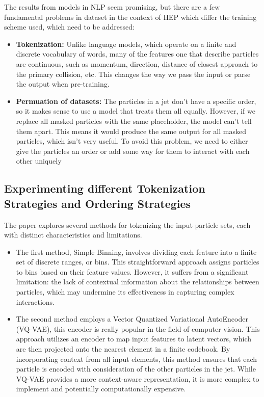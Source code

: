 \documentclass[letterpaper,12pt]{article}
\begin{document}
\begin{spacing}{1.125}
The results from models in NLP seem promising, but there are a few fundamental
problems in dataset in the context of HEP which differ the training scheme used,
which need to be addressed:
\begin{itemize}
  \item \textbf{Tokenization:} Unlike language models, which operate on a finite and
discrete vocabulary of words, many of the features one that describe particles
are continuous, such as momentum, direction, distance of closest approach to
the primary collision, etc. This changes the way we pass the input or parse
the output when pre-training.

\item \textbf{Permuation of datasets:} The particles in a jet don’t have a specific order,
so it makes sense to use a model that treats them all equally. However, if we
replace all masked particles with the same placeholder, the model can’t tell
them apart. This means it would produce the same output for all masked
particles, which isn’t very useful. To avoid this problem, we need to either
give the particles an order or add some way for them to interact with each
other uniquely
\end{itemize}


\subsection{Experimenting different Tokenization Strategies and Ordering Strategies}

The paper explores several methods for tokenizing the input particle sets, each with distinct characteristics and limitations.

\begin{itemize}
\item The first method, Simple Binning, involves dividing each feature into a finite set of discrete ranges, or bins. This straightforward approach assigns particles to bins based on their feature values. However, it suffers from a significant limitation: the lack of contextual information about the relationships between particles, which may undermine its effectiveness in capturing complex interactions.

\item The second method employs a Vector Quantized Variational AutoEncoder
  (VQ-VAE), this encoder is really popular in the field of computer vision. This approach utilizes an encoder to map input features to latent vectors, which are then projected onto the nearest element in a finite codebook. By incorporating context from all input elements, this method ensures that each particle is encoded with consideration of the other particles in the jet. While VQ-VAE provides a more context-aware representation, it is more complex to implement and potentially computationally expensive.


\end{itemize}
\end{spacing}
\end{document}
